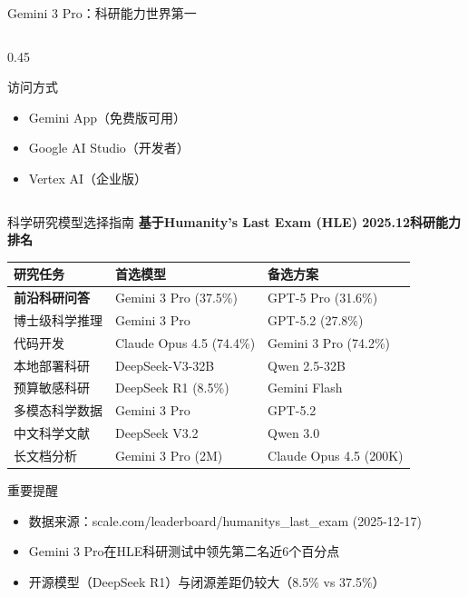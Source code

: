 \documentclass[aspectratio=169,11pt]{beamer}
\begin{document}
\begin{frame}{Gemini 3 Pro：科研能力世界第一}
\begin{columns}
\begin{column}{0.45\textwidth}
            \vspace{0.2cm}
            \begin{exampleblock}{访问方式}
                \begin{itemize}
                    \item Gemini App（免费版可用）
                    \item Google AI Studio（开发者）
                    \item Vertex AI（企业版）
                \end{itemize}
            \end{exampleblock}
        \end{column}
    \end{columns}
\end{frame}

\begin{frame}{科学研究模型选择指南}
    \textbf{基于Humanity's Last Exam (HLE) 2025.12科研能力排名}
    
    \vspace{0.3cm}
    \begin{tabular}{p{3.5cm}p{4cm}p{4cm}}
        \toprule
        \textbf{研究任务} & \textbf{首选模型} & \textbf{备选方案} \\
        \midrule
        \textbf{前沿科研问答} & Gemini 3 Pro (37.5\%) & GPT-5 Pro (31.6\%) \\
        博士级科学推理 & Gemini 3 Pro & GPT-5.2 (27.8\%) \\
        代码开发 & Claude Opus 4.5 (74.4\%) & Gemini 3 Pro (74.2\%) \\
        本地部署科研 & DeepSeek-V3-32B & Qwen 2.5-32B \\
        预算敏感科研 & DeepSeek R1 (8.5\%) & Gemini Flash \\
        多模态科学数据 & Gemini 3 Pro & GPT-5.2 \\
        中文科学文献 & DeepSeek V3.2 & Qwen 3.0 \\
        长文档分析 & Gemini 3 Pro (2M) & Claude Opus 4.5 (200K) \\
        \bottomrule
    \end{tabular}
    
    \vspace{0.3cm}
    \begin{alertblock}{重要提醒}
        \begin{itemize}
            \item 数据来源：scale.com/leaderboard/humanitys\_last\_exam (2025-12-17)
            \item Gemini 3 Pro在HLE科研测试中领先第二名近6个百分点
            \item 开源模型（DeepSeek R1）与闭源差距仍较大（8.5\% vs 37.5\%）
        \end{itemize}
    \end{alertblock}
\end{frame}
\end{document}
